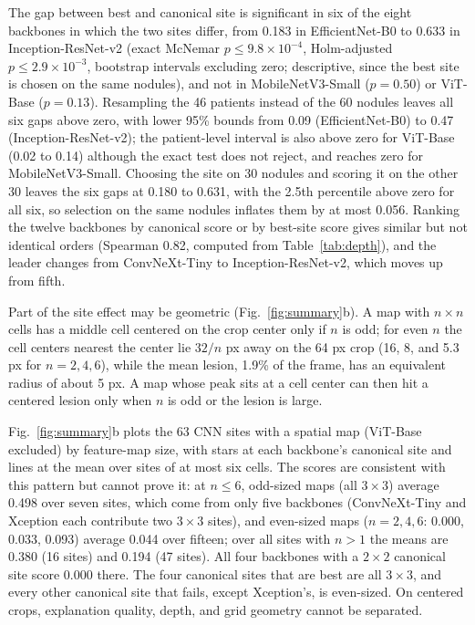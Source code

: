 \documentclass[conference]{IEEEtran}
\begin{document}
The gap between best and canonical site is significant in six of the eight backbones in which the two sites differ, from 0.183 in EfficientNet-B0 to 0.633 in Inception-ResNet-v2 (exact McNemar $p\leq9.8\times10^{-4}$, Holm-adjusted $p\leq2.9\times10^{-3}$, bootstrap intervals excluding zero; descriptive, since the best site is chosen on the same nodules), and not in MobileNetV3-Small ($p=0.50$) or ViT-Base ($p=0.13$). Resampling the 46 patients instead of the 60 nodules leaves all six gaps above zero, with lower 95\% bounds from 0.09 (EfficientNet-B0) to 0.47 (Inception-ResNet-v2); the patient-level interval is also above zero for ViT-Base (0.02 to 0.14) although the exact test does not reject, and reaches zero for MobileNetV3-Small. Choosing the site on 30 nodules and scoring it on the other 30 leaves the six gaps at 0.180 to 0.631, with the 2.5th percentile above zero for all six, so selection on the same nodules inflates them by at most 0.056. Ranking the twelve backbones by canonical score or by best-site score gives similar but not identical orders (Spearman 0.82, computed from Table~\ref{tab:depth}), and the leader changes from ConvNeXt-Tiny to Inception-ResNet-v2, which moves up from fifth.

Part of the site effect may be geometric (Fig.~\ref{fig:summary}b). A map with $n\times n$ cells has a middle cell centered on the crop center only if $n$ is odd; for even $n$ the cell centers nearest the center lie $32/n$ px away on the 64 px crop (16, 8, and 5.3 px for $n=2,4,6$), while the mean lesion, 1.9\% of the frame, has an equivalent radius of about 5 px. A map whose peak sits at a cell center can then hit a centered lesion only when $n$ is odd or the lesion is large.

Fig.~\ref{fig:summary}b plots the 63 CNN sites with a spatial map (ViT-Base excluded) by feature-map size, with stars at each backbone's canonical site and lines at the mean over sites of at most six cells. The scores are consistent with this pattern but cannot prove it: at $n\leq6$, odd-sized maps (all $3\times3$) average 0.498 over seven sites, which come from only five backbones (ConvNeXt-Tiny and Xception each contribute two $3\times3$ sites), and even-sized maps ($n=2,4,6$: 0.000, 0.033, 0.093) average 0.044 over fifteen; over all sites with $n>1$ the means are 0.380 (16 sites) and 0.194 (47 sites). All four backbones with a $2\times2$ canonical site score 0.000 there. The four canonical sites that are best are all $3\times3$, and every other canonical site that fails, except Xception's, is even-sized. On centered crops, explanation quality, depth, and grid geometry cannot be separated.
\end{document}
